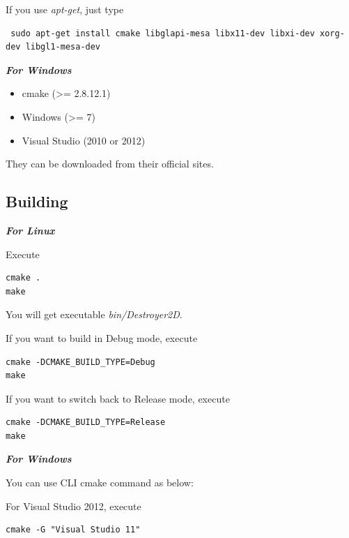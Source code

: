\documentclass[UTF8]{ctexart}
\begin{document}
            If you use \textit{apt-get}, just type

            \begin{verbatim} sudo apt-get install cmake libglapi-mesa libx11-dev libxi-dev xorg-dev libgl1-mesa-dev \end{verbatim}

            \noindent \textbf{\textit{For Windows}}

            \begin{itemize}
                \item cmake (>= 2.8.12.1)
                \item Windows (>= 7)
                \item Visual Studio (2010 or 2012)
            \end{itemize}

            They can be downloaded from their official sites.

        \subsection{Building}

            \noindent \textbf{\textit{For Linux}}

            Execute

            \begin{verbatim}cmake .
make \end{verbatim}

            You will get executable \textit{bin/Destroyer2D}.

            If you want to build in Debug mode, execute

            \begin{verbatim}cmake -DCMAKE_BUILD_TYPE=Debug
make \end{verbatim}

            If you want to switch back to Release mode, execute

            \begin{verbatim}cmake -DCMAKE_BUILD_TYPE=Release
make \end{verbatim}

            \noindent \textbf{\textit{For Windows}}

            You can use CLI cmake command as below:

            For Visual Studio 2012, execute

            \begin{verbatim}cmake -G "Visual Studio 11" \end{verbatim}
\end{document}
